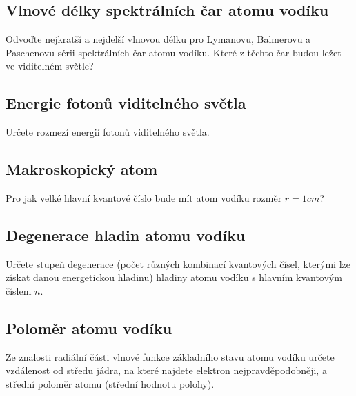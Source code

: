 \subsection{Vlnové délky spektrálních čar atomu vodíku}
    Odvoďte nejkratší a nejdelší vlnovou délku pro Lymanovu, Balmerovu a Paschenovu sérii spektrálních čar atomu vodíku. Které z těchto čar budou ležet ve viditelném světle?

\subsection{Energie fotonů viditelného světla}
    Určete rozmezí energií fotonů viditelného světla.

\subsection{Makroskopický atom}
    Pro jak velké hlavní kvantové číslo bude mít atom vodíku rozměr $r=1\unit{cm}$?

\subsection{Degenerace hladin atomu vodíku}
    Určete stupeň degenerace (počet různých kombinací kvantových čísel, kterými lze získat danou energetickou hladinu) hladiny atomu vodíku s hlavním kvantovým číslem $n$.

\subsection{Poloměr atomu vodíku}
    Ze znalosti radiální části vlnové funkce základního stavu atomu vodíku určete vzdálenost od středu jádra, na které najdete elektron nejpravděpodobněji, a střední poloměr atomu (střední hodnotu polohy).

